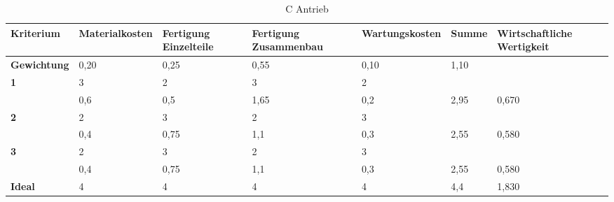 \documentclass[10pt,a4paper]{article}
\begin{document}
\begin{table}[h!]
    \centering
    \hspace*{0in} %
    \begin{tabular}{>{\bfseries}p{2cm} p{2.2cm} p{2cm} p{2cm} p{2.5cm} p{2cm} p{2cm}}
        \toprule
        Kriterium  & Materialkosten & Fertigung Einzelteile & Fertigung Zusammenbau & Wartungskosten & Summe & Wirtschaftliche Wertigkeit \\
        \midrule
        Gewichtung & 0,20           & 0,25                  & 0,55                  & 0,10           & 1,10  &                            \\
        \midrule
        1          & 3              & 2                     & 3                     & 2              &       &                            \\
                   & 0,6            & 0,5                   & 1,65                  & 0,2            & 2,95  & 0,670                      \\
        \midrule
        2          & 2              & 3                     & 2                     & 3              &       &                            \\
                   & 0,4            & 0,75                  & 1,1                   & 0,3            & 2,55  & 0,580                      \\
        \midrule
        3          & 2              & 3                     & 2                     & 3              &       &                            \\
                   & 0,4            & 0,75                  & 1,1                   & 0,3            & 2,55  & 0,580                      \\
        \midrule
        Ideal      & 4              & 4                     & 4                     & 4              & 4,4   & 1,830                      \\
        \bottomrule
    \end{tabular}
    \caption{C Antrieb}
\end{table}
\end{document}
